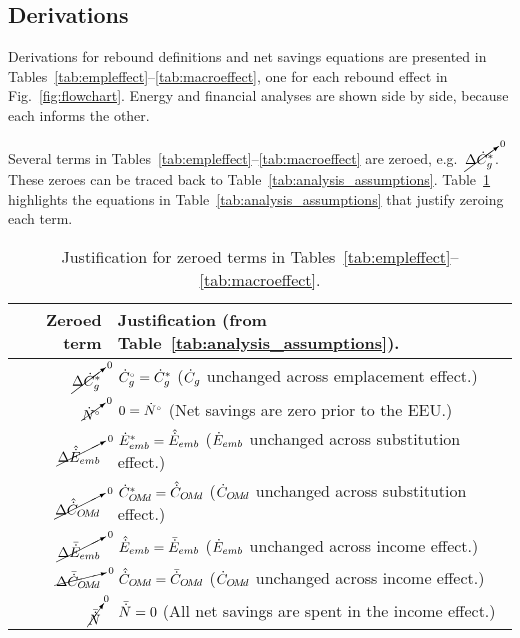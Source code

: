 


\subsection{Derivations}
\label{sec:derivations}

Derivations for rebound definitions and net savings equations
are presented in Tables~\ref{tab:empleffect}--\ref{tab:macroeffect},
one for each rebound effect in Fig.~\ref{fig:flowchart}.
Energy and financial analyses are shown side by side, because
each informs the other.

Several terms in Tables~\ref{tab:empleffect}--\ref{tab:macroeffect}
are zeroed, e.g.\ $\cancelto{0}{\Delta {\dot{C}}^*_g}$.
These zeroes can be traced back to Table~\ref{tab:analysis_assumptions}.
Table~\ref{tab:zeroed_terms} highlights the equations
in Table~\ref{tab:analysis_assumptions}
that justify zeroing each term.

\begin{table}
\footnotesize
\centering %
\caption{Justification for zeroed terms in Tables~\ref{tab:empleffect}--\ref{tab:macroeffect}.}
\begin{tabular}{r l}
  \toprule
  Zeroed term & Justification (from Table~\ref{tab:analysis_assumptions}). \\
  \midrule
  $\cancelto{0}{\Delta {\dot{C}}^*_g}$    & ${}{\dot{C}}^{\scriptscriptstyle \circ}_g = {\dot{C}}^*_g$ ($\dot{C}_g$ unchanged across emplacement effect.) \\
  $\cancelto{0}{{}{\dot{N}}^{\scriptscriptstyle \circ}}$              & $0 = {}{\dot{N}}^{\scriptscriptstyle \circ}$ (Net savings are zero prior to the EEU.) \\
  $\cancelto{0}{\Delta \hat{\dot{E}}_{emb}}$ & ${\dot{E}}^*_{emb} = \hat{\dot{E}}_{emb}$ ($\dot{E}_{emb}$ unchanged across substitution effect.) \\
  $\cancelto{0}{\Delta \hat{\dot{C}}_{O\!M\!d}}$ & ${\dot{C}}^*_{O\!M\!d} = \hat{\dot{C}}_{O\!M\!d}$ ($\dot{C}_{O\!M\!d}$ unchanged across substitution effect.) \\
  $\cancelto{0}{\Delta \bar{\dot{E}}_{emb}}$ & $\hat{\dot{E}}_{emb} = \bar{\dot{E}}_{emb}$ ($\dot{E}_{emb}$ unchanged across income effect.) \\
  $\cancelto{0}{\Delta \bar{\dot{C}}_{O\!M\!d}}$ & $\hat{\dot{C}}_{O\!M\!d} = \bar{\dot{C}}_{O\!M\!d}$ ($\dot{C}_{O\!M\!d}$ unchanged across income effect.) \\
  $\cancelto{0}{\bar{\dot{N}}}$              & $\bar{\dot{N}} = 0$ (All net savings are spent in the income effect.) \\
  \bottomrule
\end{tabular}
\label{tab:zeroed_terms}
\end{table}



